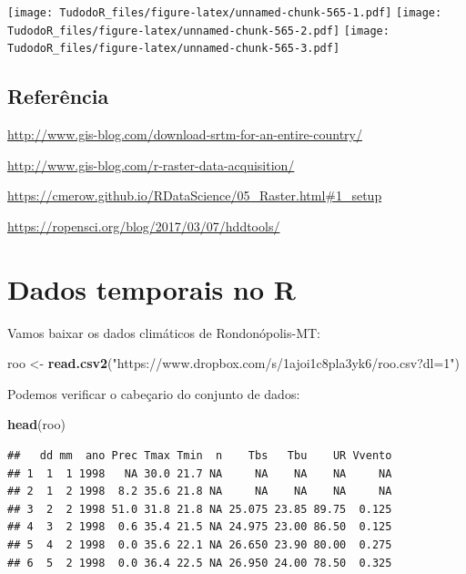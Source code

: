 \documentclass[
]{book}
\newenvironment{Shaded}{\begin{snugshade}}{\end{snugshade}}
\newcommand{\KeywordTok}[1]{\textcolor[rgb]{0.13,0.29,0.53}{\textbf{#1}}}
\newcommand{\NormalTok}[1]{#1}
\newcommand{\StringTok}[1]{\textcolor[rgb]{0.31,0.60,0.02}{#1}}
\begin{document}
\texttt{[image: TudodoR\_files/figure-latex/unnamed-chunk-565-1.pdf]} \texttt{[image: TudodoR\_files/figure-latex/unnamed-chunk-565-2.pdf]} \texttt{[image: TudodoR\_files/figure-latex/unnamed-chunk-565-3.pdf]}

\hypertarget{referuxeancia-7}{%
\subsection{Referência}\label{referuxeancia-7}}

\url{http://www.gis-blog.com/download-srtm-for-an-entire-country/}

\url{http://www.gis-blog.com/r-raster-data-acquisition/}

\url{https://cmerow.github.io/RDataScience/05_Raster.html\#1_setup}

\url{https://ropensci.org/blog/2017/03/07/hddtools/}

\hypertarget{dados-temporais-no-r}{%
\section{Dados temporais no R}\label{dados-temporais-no-r}}

Vamos baixar os dados climáticos de Rondonópolis-MT:

\begin{Shaded}
\begin{Highlighting}[]
\NormalTok{roo <-}\StringTok{ }\KeywordTok{read.csv2}\NormalTok{(}\StringTok{"https://www.dropbox.com/s/1ajoi1c8pla3yk6/roo.csv?dl=1"}\NormalTok{)}
\end{Highlighting}
\end{Shaded}

Podemos verificar o cabeçario do conjunto de dados:

\begin{Shaded}
\begin{Highlighting}[]
\KeywordTok{head}\NormalTok{(roo)}
\end{Highlighting}
\end{Shaded}

\begin{verbatim}
##   dd mm  ano Prec Tmax Tmin  n    Tbs   Tbu    UR Vvento
## 1  1  1 1998   NA 30.0 21.7 NA     NA    NA    NA     NA
## 2  1  2 1998  8.2 35.6 21.8 NA     NA    NA    NA     NA
## 3  2  2 1998 51.0 31.8 21.8 NA 25.075 23.85 89.75  0.125
## 4  3  2 1998  0.6 35.4 21.5 NA 24.975 23.00 86.50  0.125
## 5  4  2 1998  0.0 35.6 22.1 NA 26.650 23.90 80.00  0.275
## 6  5  2 1998  0.0 36.4 22.5 NA 26.950 24.00 78.50  0.325
\end{verbatim}
\end{document}
